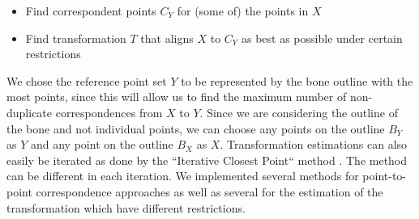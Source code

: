 \documentclass[pdftex,12pt,a4paper]{report}
\begin{document}
\begin{itemize}
\item Find correspondent points $C_Y$ for (some of) the points in $X$
\item Find transformation $T$ that aligns $X$ to $C_Y$ as best as possible under certain restrictions
\end{itemize}

We chose the reference point set $Y$ to be represented by the bone outline with the most points, since this will allow
us to find the maximum number of non-duplicate correspondences from $X$ to $Y$. Since we are considering the outline of the bone and not
individual points, we can choose any points on the outline $B_Y$ as $Y$ and any point on the outline $B_X$ as $X$.
Transformation estimations can also easily be iterated as done by the ``Iterative Closest Point`` method \cite{besl1992method}.
The method can be different in each iteration. We implemented several methods for point-to-point correspondence
approaches as well as several for the estimation of the transformation which have different restrictions.
\end{document}
